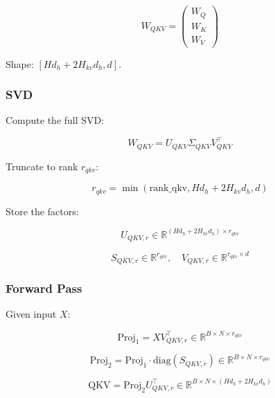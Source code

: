 \begin{equation}
W_{QKV} = \begin{pmatrix} W_Q \\ W_K \\ W_V \end{pmatrix}
\end{equation}

Shape: $[H d_h + 2 H_{kv} d_h, d]$.

\subsubsection{SVD}

Compute the full SVD:

\begin{equation}
W_{QKV} = U_{QKV} \Sigma_{QKV} V_{QKV}^\top
\end{equation}

Truncate to rank $r_{qkv}$:

\begin{equation}
r_{qkv} = \min(\text{rank\_qkv}, H d_h + 2 H_{kv} d_h, d)
\end{equation}

Store the factors:

\begin{equation}
U_{QKV, r} \in \mathbb{R}^{(H d_h + 2 H_{kv} d_h) \times r_{qkv}}
\end{equation}

\begin{equation}
S_{QKV, r} \in \mathbb{R}^{r_{qkv}}, \quad
V_{QKV, r} \in \mathbb{R}^{r_{qkv} \times d}
\end{equation}

\subsubsection{Forward Pass}

Given input $X$:

\begin{equation}
\text{Proj}_1 = X V_{QKV, r}^\top \in \mathbb{R}^{B \times N \times r_{qkv}}
\end{equation}

\begin{equation}
\text{Proj}_2 = \text{Proj}_1 \cdot \text{diag}(S_{QKV, r}) \in \mathbb{R}^{B \times N \times r_{qkv}}
\end{equation}

\begin{equation}
\text{QKV} = \text{Proj}_2 U_{QKV, r}^\top \in \mathbb{R}^{B \times N \times (H d_h + 2 H_{kv} d_h)}
\end{equation}

